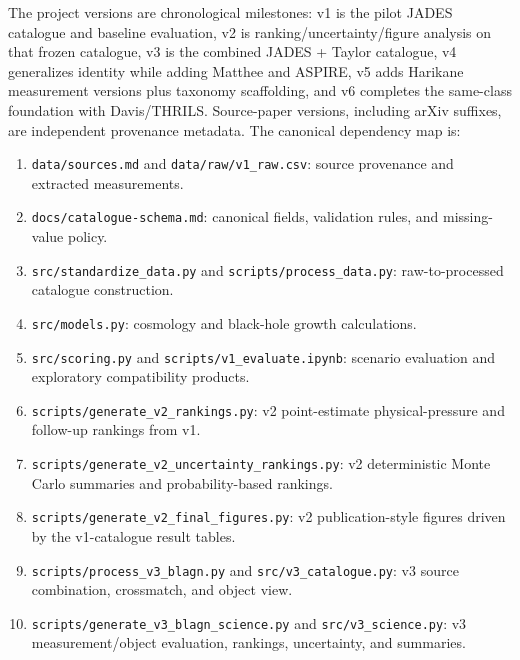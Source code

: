 \documentclass[11pt]{article}
\newcommand{\repo}[1]{{\footnotesize\texttt{#1}}}
\begin{document}
The project versions are chronological milestones: v1 is the pilot JADES catalogue and baseline evaluation, v2 is ranking/uncertainty/figure analysis on that frozen catalogue, v3 is the combined JADES + Taylor catalogue, v4 generalizes identity while adding Matthee and ASPIRE, v5 adds Harikane measurement versions plus taxonomy scaffolding, and v6 completes the same-class foundation with Davis/THRILS. Source-paper versions, including arXiv suffixes, are independent provenance metadata. The canonical dependency map is:

\begin{enumerate}
  \item \repo{data/sources.md} and \repo{data/raw/v1\_raw.csv}: source provenance and extracted measurements.\par
  \item \repo{docs/catalogue-schema.md}: canonical fields, validation rules, and missing-value policy.\par
  \item \repo{src/standardize\_data.py} and \repo{scripts/process\_data.py}: raw-to-processed catalogue construction.\par
  \item \repo{src/models.py}: cosmology and black-hole growth calculations.\par
  \item \repo{src/scoring.py} and \repo{scripts/v1\_evaluate.ipynb}: scenario evaluation and exploratory compatibility products.\par
  \item \repo{scripts/generate\_v2\_rankings.py}: v2 point-estimate physical-pressure and follow-up rankings from v1.\par
  \item \repo{scripts/generate\_v2\_uncertainty\_rankings.py}: v2 deterministic Monte Carlo summaries and probability-based rankings.\par
  \item \repo{scripts/generate\_v2\_final\_figures.py}: v2 publication-style figures driven by the v1-catalogue result tables.\par
  \item \repo{scripts/process\_v3\_blagn.py} and \repo{src/v3\_catalogue.py}: v3 source combination, crossmatch, and object view.\par
  \item \repo{scripts/generate\_v3\_blagn\_science.py} and \repo{src/v3\_science.py}: v3 measurement/object evaluation, rankings, uncertainty, and summaries.\par

\end{enumerate}
\end{document}
